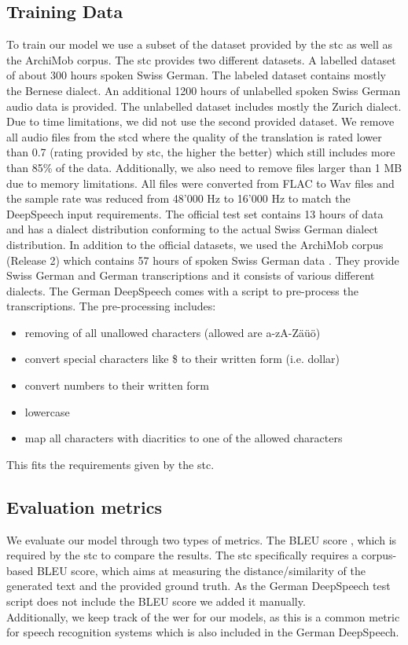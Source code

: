 \subsection{Training Data}
To train our model we use a subset of the dataset provided by the \gls{stc} as well as the ArchiMob corpus. The \gls{stc} provides two different datasets. A labelled dataset of about 300 hours spoken
Swiss German. The labeled dataset contains mostly the Bernese dialect. An additional 1200 hours of unlabelled spoken Swiss German audio data is provided. The unlabelled dataset includes mostly the
Zurich dialect. Due to time limitations, we did not use the second provided dataset. We remove all audio files from the \gls{stcd} where the quality of the translation is rated lower than 0.7 (rating
provided by \gls{stc}, the higher the better) which still includes more than 85\% of the data. Additionally, we also need to remove files larger than 1 MB due to memory limitations. All files were converted from FLAC to Wav files and the sample rate was reduced from 48'000 Hz to 16'000 Hz to match the DeepSpeech input requirements. The official test set contains 13 hours of data and has a dialect distribution conforming to the actual Swiss German dialect distribution. In addition to the official datasets, we used the ArchiMob corpus (Release 2) which contains 57 hours of spoken Swiss German data \cite{archimob2016}. They provide Swiss German and German transcriptions and it consists of various different dialects.
The German DeepSpeech comes with a script to pre-process the transcriptions. The pre-processing includes:
\begin{itemize}
\item removing of all unallowed characters (allowed are a-zA-Zäüö)
\item convert special characters like \$ to their written form (i.e. dollar)
\item convert numbers to their written form
\item lowercase
\item map all characters with diacritics to one of the allowed characters
\end{itemize}

This fits the requirements given by the \gls{stc}.

\subsection{Evaluation metrics}
We evaluate our model through two types of metrics. The BLEU score \cite{Papineni2002BleuAM}, which is required by the \gls{stc} to compare the results. The \gls{stc} specifically requires a corpus-based BLEU score, which aims at measuring the distance/similarity of the generated text and the provided ground truth. As the German DeepSpeech test script does not include the BLEU score we added it manually. \\ Additionally, we keep track of the \gls{wer} for our models, as
this is a common metric for speech recognition systems \cite{Park2008AnEA} which is also included in the German DeepSpeech.

